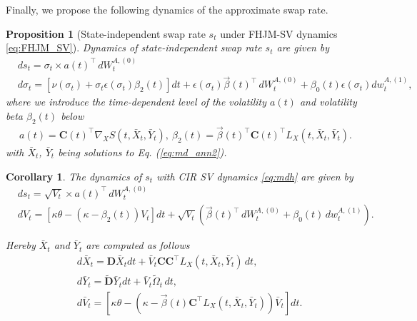 \documentclass[pdftex,11pt,a4paper] {article}
\newtheorem{corollary}{Corollary}[section]
\newtheorem{proposition}{Proposition}[section]
\begin{document}
Finally, we propose the following dynamics of the approximate swap rate.
\begin{proposition} [State-independent swap rate $s_t$ under FHJM-SV dynamics \eqref{eq:FHJM_SV}] Dynamics of state-independent swap rate $s_t$ are given by
\begin{equation}\label{eq:swap_ann2}
\begin{split}
&ds_t=\sigma_t\times a(t)^\top\, dW^{A,(0)}_t\\
&d\sigma_t=\left[\nu(\sigma_t)+\sigma_t\epsilon(\sigma_t)\beta_2(t)\right]dt+\epsilon(\sigma_t)\vec{\beta}(t)^\top\,dW^{A,(0)}_t + \beta_{0}(t)\epsilon(\sigma_t)dw^{A,(1)}_t,
\end{split}
\end{equation}
where we introduce the time-dependent level of the volatility $a(t)$ and volatility beta $\beta_2(t)$ below
\begin{equation}\label{eq:def1}
\begin{split}
a(t)=\mathbf{C}(t)^\top \nabla_X S(t,\bar X_t, \bar Y_t),\ \beta_2(t)=\vec{\beta}(t)^\top \mathbf{C}(t)^\top L_X(t,\bar X_t, \bar Y_t).
\end{split}
\end{equation}
with $\bar X_t$, $\bar Y_t$ being solutions to Eq. (\ref{eq:md_ann2}).

\end{proposition}







\begin{corollary} The dynamics of $s_t$ with CIR SV dynamics \eqref{eq:mdh} are given by
\begin{equation}\label{eq:swap_ann2_cir}
\begin{split}
&ds_t=\sqrt{V_t}\times a(t)^\top\, dW^{A,(0)}_t\\
&dV_{t}=\left[\kappa\theta-\left(\kappa-\beta_2(t)\right)V_{t}\right]dt + \sqrt{V_{t}} \left(\vec{\beta}(t)^\top\,dW^{A,(0)}_t+\beta_{0}(t)\,dw^{A,(1)}_t\right).
\end{split}
\end{equation}

Hereby $\bar X_{t}$ and $\bar Y_{t}$ are computed as follows
\begin{equation}\label{eq:md_ann_expect_cirsv}
\begin{split}
&   d\bar X_{t} = \mathbf{D} \bar X_{t}dt  +  \bar V_t\mathbf{C}\mathbf{C}^\top L_X(t,\bar X_t, \bar Y_t)\,dt,\\
& d\bar Y_{t} = \tilde{\mathbf{D}}\bar Y_{t}dt + \bar V_t\tilde\Omega_t\,dt,\\
&d\bar V_{t}=\left[\kappa\theta-\left(\kappa-\vec\beta(t)\mathbf{C}^\top L_X(t,\bar X_t,\bar Y_t)\right)\bar V_{t}\right]dt .
\end{split}
\end{equation}

\end{corollary}
\end{document}
